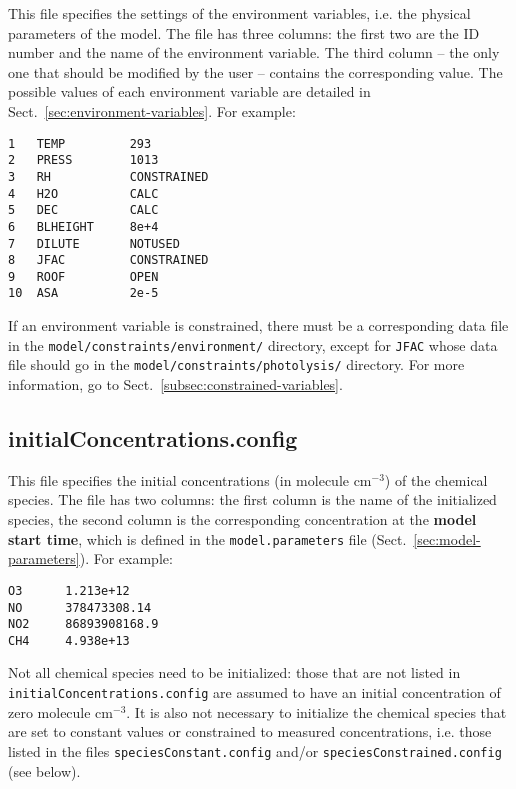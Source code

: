 This file specifies the settings of the environment variables, i.e.
the physical parameters of the model. The file has three columns: the
first two are the ID number and the name of the environment variable.
The third column -- the only one that should be modified by the
user -- contains the corresponding value. The possible values of each
environment variable are detailed in Sect.~\ref{sec:environment-variables}.
For example:

\begin{verbatim}
1   TEMP         293
2   PRESS        1013
3   RH           CONSTRAINED
4   H2O          CALC
5   DEC          CALC
6   BLHEIGHT     8e+4
7   DILUTE       NOTUSED
8   JFAC         CONSTRAINED
9   ROOF         OPEN
10  ASA          2e-5
\end{verbatim}

If an environment variable is constrained, there must be a
corresponding data file in the \texttt{model/constraints/environment/}
directory, except for \texttt{JFAC} whose data file should go in the
\texttt{model/constraints/photolysis/} directory. For more
information, go to Sect.~\ref{subsec:constrained-variables}.

\subsection{initialConcentrations.config} \label{subsec:initialconcentrations}

This file specifies the initial concentrations (in molecule cm$^{-3}$)
of the chemical species. The file has two columns: the first column is the
name of the initialized species, the second column is the corresponding
concentration at the \textbf{model start time}, which is defined
in the \texttt{model.parameters} file (Sect.~\ref{sec:model-parameters}).
For example:

\begin{verbatim}
O3      1.213e+12
NO      378473308.14
NO2     86893908168.9
CH4     4.938e+13
\end{verbatim}

Not all chemical species need to be initialized: those that are not
listed in \texttt{initialConcentrations.config} are assumed to have an
initial concentration of zero molecule cm$^{-3}$. It is also not necessary
to initialize the chemical species that are set to constant values or
constrained to measured concentrations, i.e. those listed in the files
\texttt{speciesConstant.config} and/or \texttt{speciesConstrained.config}
(see below).


